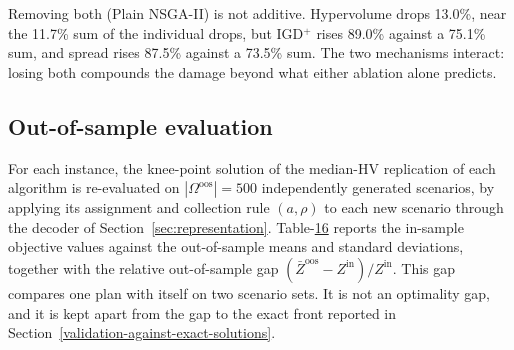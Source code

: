 \documentclass[11pt, a4paper]{article}
\begin{document}
Removing both (Plain NSGA-II) is not additive. Hypervolume drops 13.0\%, near the 11.7\% sum of the individual drops, but IGD$^+$ rises 89.0\% against a 75.1\% sum, and spread rises 87.5\% against a 73.5\% sum. The two mechanisms interact: losing both compounds the damage beyond what either ablation alone predicts.

\hypertarget{out-of-sample-evaluation}{%
\subsection{Out-of-sample evaluation}\label{out-of-sample-evaluation}}

For each instance, the knee-point solution of the median-HV replication of each algorithm is re-evaluated on $|\Omega^{\mathrm{oos}}| = 500$ independently generated scenarios, by applying its assignment and collection rule $(a,\rho)$ to each new scenario through the decoder of Section~\ref{sec:representation}.
Table-\protect\hyperlink{tab:OOS}{16} reports the in-sample objective values against the out-of-sample means and standard deviations, together with the relative out-of-sample gap $(\bar{Z}^{\mathrm{oos}} - Z^{\mathrm{in}})/Z^{\mathrm{in}}$. This gap compares one plan with itself on two scenario sets. It is not an optimality gap, and it is kept apart from the gap to the exact front reported in Section~\ref{validation-against-exact-solutions}.
\end{document}
